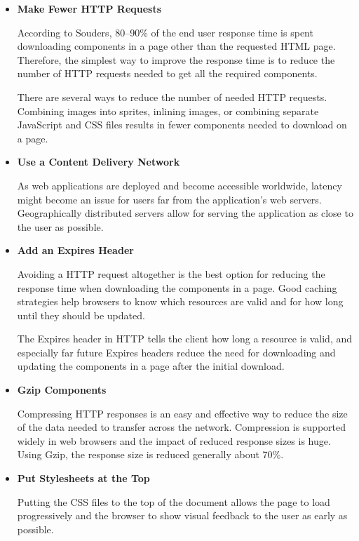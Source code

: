 \begin{itemize}


\item \textbf{Make Fewer HTTP Requests}

  According to Souders, 80--90\% of the end user response time is
  spent downloading components in a page other than the requested HTML
  page. Therefore, the simplest way to improve the response time is to
  reduce the number of HTTP requests needed to get all the required
  components.

  There are several ways to reduce the number of needed HTTP
  requests. Combining images into sprites, inlining images, or
  combining separate JavaScript and CSS files results in fewer
  components needed to download on a page.

\item \textbf{Use a Content Delivery Network}

  As web applications are deployed and become accessible worldwide,
  latency might become an issue for users far from the application's
  web servers. Geographically distributed servers allow for serving
  the application as close to the user as possible.

\item \textbf{Add an Expires Header}

  Avoiding a HTTP request altogether is the best option for reducing
  the response time when downloading the components in a page. Good
  caching strategies help browsers to know which resources are valid
  and for how long until they should be updated.

  The Expires header in HTTP tells the client how long a resource is
  valid, and especially far future Expires headers reduce the need for
  downloading and updating the components in a page after the initial
  download.

\item \textbf{Gzip Components}

  Compressing HTTP responses is an easy and effective way to reduce
  the size of the data needed to transfer across the
  network. Compression is supported widely in web browsers and the
  impact of reduced response sizes is huge. Using Gzip, the response
  size is reduced generally about 70\%.

\item \textbf{Put Stylesheets at the Top}

  Putting the CSS files to the top of the document allows the page to
  load progressively and the browser to show visual feedback to the
  user as early as possible.


\end{itemize}
